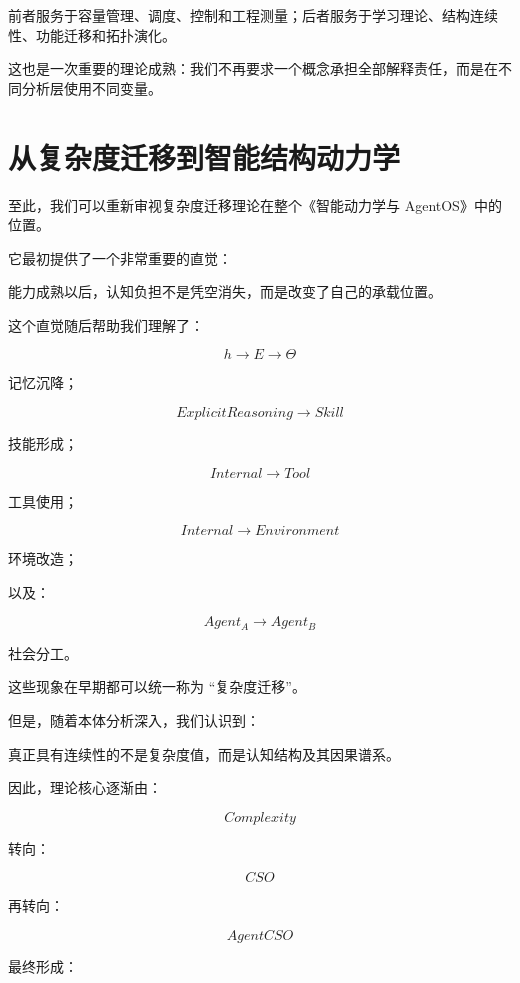 前者服务于容量管理、调度、控制和工程测量；后者服务于学习理论、结构连续性、功能迁移和拓扑演化。

这也是一次重要的理论成熟：我们不再要求一个概念承担全部解释责任，而是在不同分析层使用不同变量。

\section{从复杂度迁移到智能结构动力学}
\label{sec:complexity-to-structural-dynamics}

至此，我们可以重新审视复杂度迁移理论在整个《智能动力学与 AgentOS》中的位置。

它最初提供了一个非常重要的直觉：

\begin{statementbox}
能力成熟以后，认知负担不是凭空消失，而是改变了自己的承载位置。
\end{statementbox}

这个直觉随后帮助我们理解了：

\[
h\rightarrow E\rightarrow\Theta
\]

记忆沉降；

\[
ExplicitReasoning
\rightarrow
Skill
\]

技能形成；

\[
Internal
\rightarrow
Tool
\]

工具使用；

\[
Internal
\rightarrow
Environment
\]

环境改造；

以及：

\[
Agent_A
\rightarrow
Agent_B
\]

社会分工。

这些现象在早期都可以统一称为 ``复杂度迁移''。

但是，随着本体分析深入，我们认识到：

\begin{statementbox}
真正具有连续性的不是复杂度值，而是认知结构及其因果谱系。
\end{statementbox}

因此，理论核心逐渐由：

\[
Complexity
\]

转向：

\[
CSO
\]

再转向：

\[
AgentCSO
\]

最终形成：

\begin{statementbox}
\centering
{}
\end{statementbox}

